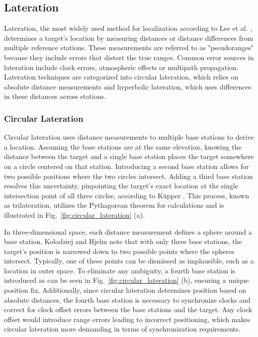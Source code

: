 \subsection{Lateration}
\label{sec:lateration}
Lateration, the most widely used method for localization according to Lee et al. \cite{lee2014localization}, determines a target's location by measuring distances or distance differences from multiple reference stations. 
These measurements are referred to as "pseudoranges" because they include errors that distort the true ranges. 
Common error sources in lateration include clock errors, atmospheric effects or multipath propagation.
Lateration techniques are categorized into circular lateration, which relies on absolute distance measurements and hyperbolic lateration, which uses differences in these distances across stations.

\subsubsection{Circular Lateration}
Circular lateration uses distance measurements to multiple base stations to derive a location. 
Assuming the base stations are at the same elevation, knowing the distance between the target and a single base station places the target somewhere on a circle centered on that station. 
Introducing a second base station allows for two possible positions where the two circles intersect. 
Adding a third base station resolves this uncertainty, pinpointing the target's exact location at the single intersection point of all three circles, according to K\"upper \cite{kupper2005location}. 
This process, known as trilateration, utilizes the Pythagorean theorem for calculations and is illustrated in Fig.~\ref{fig:circular_lateration} (a).

In three-dimensional space, each distance measurement defines a sphere around a base station. 
Kolodziej and Hjelm \cite{kolodziej2017local} note that with only three base stations, the target's position is narrowed down to two possible points where the spheres intersect. 
Typically, one of these points can be dismissed as implausible, such as a location in outer space. 
To eliminate any ambiguity, a fourth base station is introduced as can be seen in Fig.~\ref{fig:circular_lateration} (b), ensuring a unique position fix. 
Additionally, since circular lateration determines position based on absolute distances, the fourth base station is necessary to synchronize clocks and correct for clock offset errors between the base stations and the target.
Any clock offset would introduce range errors leading to incorrect positioning, which makes circular lateration more demanding in terms of synchronization requirements.

